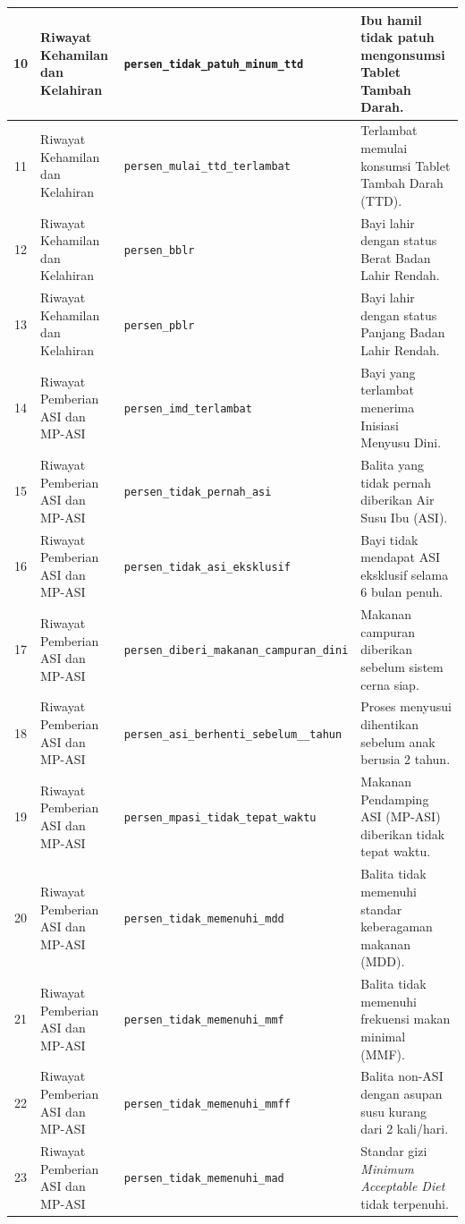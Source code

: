 \begin{longtable}{|c|p{}|p{}|p{}|}
    10 & Riwayat Kehamilan dan Kelahiran & \texttt{persen\_\allowbreak tidak\_\allowbreak patuh\_\allowbreak minum\_\allowbreak ttd} & Ibu hamil tidak patuh mengonsumsi Tablet Tambah Darah. \tabularnewline \hline
    11 & Riwayat Kehamilan dan Kelahiran & \texttt{persen\_\allowbreak mulai\_\allowbreak ttd\_\allowbreak terlambat} & Terlambat memulai konsumsi Tablet Tambah Darah (TTD). \tabularnewline \hline
    12 & Riwayat Kehamilan dan Kelahiran & \texttt{persen\_\allowbreak bblr} & Bayi lahir dengan status Berat Badan Lahir Rendah. \tabularnewline \hline
    13 & Riwayat Kehamilan dan Kelahiran & \texttt{persen\_\allowbreak pblr} & Bayi lahir dengan status Panjang Badan Lahir Rendah. \tabularnewline \hline
    14 & Riwayat Pemberian ASI dan MP-ASI & \texttt{persen\_\allowbreak imd\_\allowbreak terlambat} & Bayi yang terlambat menerima Inisiasi Menyusu Dini. \tabularnewline \hline
    15 & Riwayat Pemberian ASI dan MP-ASI & \texttt{persen\_\allowbreak tidak\_\allowbreak pernah\_\allowbreak asi} & Balita yang tidak pernah diberikan Air Susu Ibu (ASI). \tabularnewline \hline
    16 & Riwayat Pemberian ASI dan MP-ASI & \texttt{persen\_\allowbreak tidak\_\allowbreak asi\_\allowbreak eksklusif} & Bayi tidak mendapat ASI eksklusif selama 6 bulan penuh. \tabularnewline \hline
    17 & Riwayat Pemberian ASI dan MP-ASI & \texttt{persen\_\allowbreak diberi\_\allowbreak makanan\_\allowbreak campuran\_\allowbreak dini} & Makanan campuran diberikan sebelum sistem cerna siap. \tabularnewline \hline
    18 & Riwayat Pemberian ASI dan MP-ASI & \texttt{persen\_\allowbreak asi\_\allowbreak berhenti\_\allowbreak sebelum\_\allowbreak 2\_\allowbreak tahun} & Proses menyusui dihentikan sebelum anak berusia 2 tahun. \tabularnewline \hline
    19 & Riwayat Pemberian ASI dan MP-ASI & \texttt{persen\_\allowbreak mpasi\_\allowbreak tidak\_\allowbreak tepat\_\allowbreak waktu} & Makanan Pendamping ASI (MP-ASI) diberikan tidak tepat waktu. \tabularnewline \hline
    20 & Riwayat Pemberian ASI dan MP-ASI & \texttt{persen\_\allowbreak tidak\_\allowbreak memenuhi\_\allowbreak mdd} & Balita tidak memenuhi standar keberagaman makanan (MDD). \tabularnewline \hline
    21 & Riwayat Pemberian ASI dan MP-ASI & \texttt{persen\_\allowbreak tidak\_\allowbreak memenuhi\_\allowbreak mmf} & Balita tidak memenuhi frekuensi makan minimal (MMF). \tabularnewline \hline
    22 & Riwayat Pemberian ASI dan MP-ASI & \texttt{persen\_\allowbreak tidak\_\allowbreak memenuhi\_\allowbreak mmff} & Balita non-ASI dengan asupan susu kurang dari 2 kali/hari. \tabularnewline \hline
    23 & Riwayat Pemberian ASI dan MP-ASI & \texttt{persen\_\allowbreak tidak\_\allowbreak memenuhi\_\allowbreak mad} & Standar gizi \textit{Minimum Acceptable Diet} tidak terpenuhi. \tabularnewline \hline

\end{longtable}
